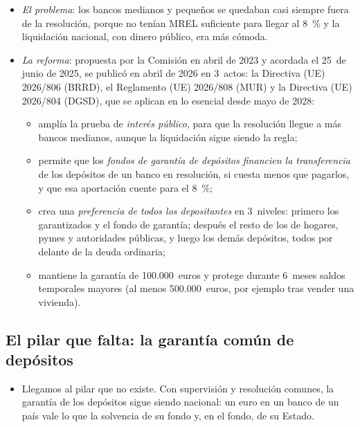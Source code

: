 \documentclass[11pt]{article}
\begin{document}
\begin{itemize}
\item \emph{El problema}: los bancos medianos y pequeños se quedaban casi siempre fuera de la resolución, porque no tenían MREL suficiente para llegar al 8~\% y la liquidación nacional, con dinero público, era más cómoda.
\item \emph{La reforma}: propuesta por la Comisión en abril de 2023 y acordada el 25~de junio de 2025, se publicó en abril de 2026 en 3~actos: la Directiva (UE) 2026/806 (BRRD), el Reglamento (UE) 2026/808 (MUR) y la Directiva (UE) 2026/804 (DGSD), que se aplican en lo esencial desde mayo de 2028\nocite{Consejo2025CMDI,UE2026Dir806,UE2026Reg808,UE2026Dir804,SRB2026CMDI}:
  \begin{itemize}
  \item amplía la prueba de \emph{interés público}, para que la resolución llegue a más bancos medianos, aunque la liquidación sigue siendo la regla;
  \item permite que los \emph{fondos de garantía de depósitos financien la transferencia} de los depósitos de un banco en resolución, si cuesta menos que pagarlos, y que esa aportación cuente para el 8~\%;
  \item crea una \emph{preferencia de todos los depositantes} en 3~niveles: primero los garantizados y el fondo de garantía; después el resto de los de hogares, pymes y autoridades públicas, y luego los demás depósitos, todos por delante de la deuda ordinaria;
  \item mantiene la garantía de 100.000~euros y protege durante 6~meses saldos temporales mayores (al menos 500.000~euros, por ejemplo tras vender una vivienda).
  \end{itemize}
\end{itemize}

\subsection{El pilar que falta:\cortetitulo{} la garantía común de depósitos}\label{sec:edis}

\begin{itemize}
\item Llegamos al pilar que no existe. Con supervisión y resolución comunes, la garantía de los depósitos sigue siendo nacional: un euro en un banco de un país vale lo que la solvencia de su fondo y, en el fondo, de su Estado.
\end{itemize}
\end{document}
